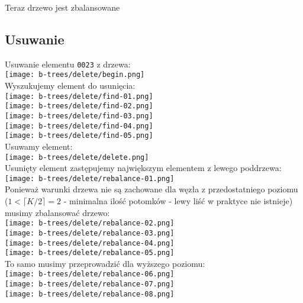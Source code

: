 \documentclass[main.tex]{subfiles}
\begin{document}
    \noindent Teraz drzewo jest zbalansowane

    \subsection{Usuwanie}
    Usuwanie elementu \texttt{0023} z drzewa: \\
    \texttt{[image: b-trees/delete/begin.png]} \\

    \noindent Wyszukujemy element do usunięcia: \\
    \texttt{[image: b-trees/delete/find-01.png]} \\
    \texttt{[image: b-trees/delete/find-02.png]} \\
    \texttt{[image: b-trees/delete/find-03.png]} \\
    \texttt{[image: b-trees/delete/find-04.png]} \\
    \texttt{[image: b-trees/delete/find-05.png]} \\

    \noindent Usuwamy element: \\
    \texttt{[image: b-trees/delete/delete.png]} \\

    \noindent Usunięty element zastępujemy największym elementem z lewego poddrzewa: \\
    \texttt{[image: b-trees/delete/rebalance-01.png]} \\

    \noindent Ponieważ warunki drzewa nie są zachowane dla węzła z przedostatniego poziomu ($1 < \lceil K/2 \rceil = 2$ - minimalna ilość potomków - lewy liść w praktyce nie istnieje) musimy zbalansować drzewo: \\
    \texttt{[image: b-trees/delete/rebalance-02.png]} \\
    \texttt{[image: b-trees/delete/rebalance-03.png]} \\
    \texttt{[image: b-trees/delete/rebalance-04.png]} \\
    \texttt{[image: b-trees/delete/rebalance-05.png]} \\

    \noindent To samo musimy przeprowadzić dla wyższego poziomu: \\
    \texttt{[image: b-trees/delete/rebalance-06.png]} \\
    \texttt{[image: b-trees/delete/rebalance-07.png]} \\
    \texttt{[image: b-trees/delete/rebalance-08.png]} \\
\end{document}
